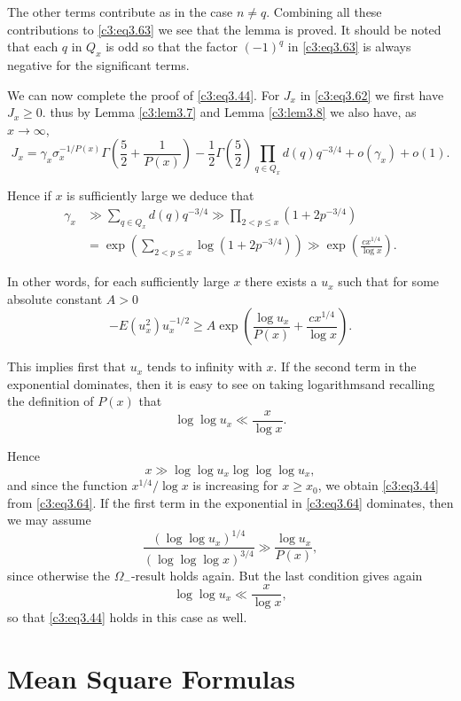 The other terms contribute as in the case $n \neq q$. Combining all
these contributions to \eqref{c3:eq3.63} we see that the lemma is
proved. It should be noted that each $q$ in $Q_x$ is odd so that the
factor $(-1)^q$ in \eqref{c3:eq3.63} is always negative for the
significant terms.

We can now complete the proof of \eqref{c3:eq3.44}. For $J_x$ in
\eqref{c3:eq3.62} we first have $J_x \geq 0$. thus by Lemma
\ref{c3:lem3.7}  and Lemma \ref{c3:lem3.8} we also have, as $x \to
\infty$,
$$
J_x =  \gamma_x \sigma_x^{-1/P(x)} \Gamma \left(\frac{5}{2} +
\frac{1}{P(x)} \right) - \frac{1}{2} \Gamma \left(\frac{5}{2} \right)
\prod_{q \in Q_x} d(q) q^{- 3/4} + o(\gamma_x) + o(1).
$$

Hence if $x$ is sufficiently large we deduce that
\begin{align*}
  \gamma_x & \gg \sum_{q \in Q_x} d(q) q^{- 3/4} \gg \prod_{2 < p \leq x}
  (1+ 2 p^{-3/4})\\
  & = \exp \left(\sum_{2 < p \leq x} \log(1+ 2p^{-3/4}) \right) \gg
  \exp \left(\frac{cx^{1/4}}{\log x} \right).
\end{align*}

In other words, for each sufficiently large $x$ there exists a $u_x$
such that for some absolute constant $A > 0$
\begin{equation}
  -E (u^2_x) u_x^{-1/2} \geq A \exp \left(\frac{\log u_x}{P(x)} +
  \frac{cx^{1/4}}{\log x} \right). \label{c3:eq3.64}
\end{equation}

This implies first that $u_x$ tends to infinity with $x$. If the
second term in the exponential dominates, then it is easy to see on
taking logarithms\pageoriginale and recalling the definition of $P(x)$
that 
$$
\log \log u_x \ll \frac{x}{\log x}.
$$

Hence 
$$
x \gg \log \log u_x \log \log \log u_x,
$$
and since the function $x^{1/4}/\log x$ is increasing for $x \geq
x_0$, we obtain \eqref{c3:eq3.44} from \eqref{c3:eq3.64}. If the first
term in the exponential in \eqref{c3:eq3.64} dominates, then we may
assume
$$
\frac{(\log \log u_x)^{1/4}}{(\log \log \log x)^{3/4}} \gg \frac{\log
  u_x}{P(x)}, 
$$
since otherwise the $\Omega_-$-result holds again. But the last
condition gives again
$$
\log \log u_x \ll \frac{x}{\log x},
$$
so that \eqref{c3:eq3.44} holds in this case as well.

\section{Mean Square Formulas}\label{c3:sec3.3}


